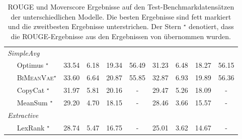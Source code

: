 \begin{table}[!h]
\begin{tabular}{@{}lcccc|cccc@{}}
    
    

    \textit{SimpleAvg}                   &       &      &       &       &       &      &       & \\
    $\quad$ Optimus  $^{\star}$          & 33.54 & 6.18 & 19.34 & 56.49 & 31.23 & 6.48 & 18.27 & 56.15\\
    $\quad$ \textsc{BiMeanVae}$^{\star}$ & 33.60 & 6.64 & 20.87 & 55.85 & 32.87 & 6.93 & 19.89 & 56.36\\
    $\quad$ CopyCat  $^{\star}$          & 31.97 & 5.81 & 20.16 & -     & 29.47 & 5.26 & 18.09 & -\\ 
    $\quad$ MeanSum  $^{\star}$          & 29.20 & 4.70 & 18.15 & -     & 28.46 & 3.66 & 15.57 & -\\ \midrule
    \textit{Extractive}                  &       &      &       &       &       &      &       &      \\
    $\quad$ LexRank  $^{\star}$          & 28.74 & 5.47 & 16.75 & -     & 25.01 & 3.62 & 14.67 & -\\ \bottomrule
    \end{tabular}
    \caption{ROUGE und Moverscore Ergebnisse auf den Test-Benchmarkdatensätzen der unterschiedlichen Modelle. Die besten Ergebnisse sind fett markiert und die zweitbesten Ergebnisse unterstrichen.
    Der Stern $^{\star}$ denotiert, dass die ROUGE-Ergebnisse aus den Ergebnissen von \citep{coop} übernommen wurden.
    }
    \label{eval_results}
\end{table}


